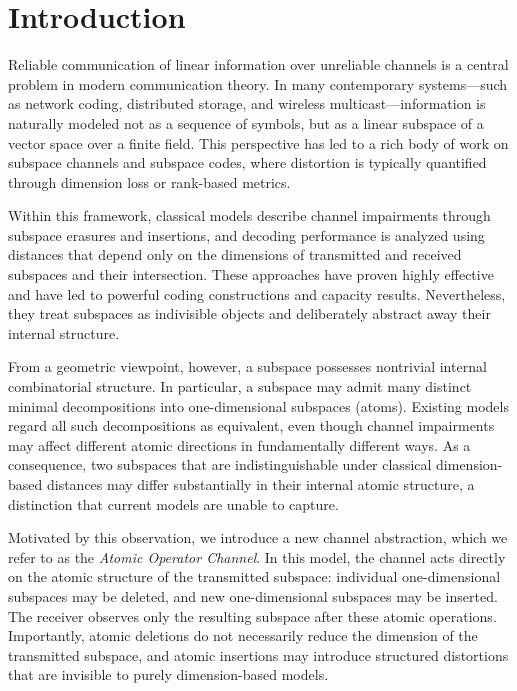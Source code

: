 \documentclass{svproc}
\begin{document}
\section{Introduction}
Reliable communication of linear information over unreliable channels is a central problem in modern communication theory. In many contemporary systems\allowbreak---such as network coding,
distributed storage, and wireless multicast\allowbreak---information is naturally modeled not as a sequence of symbols, but as a linear subspace of a vector space over a finite field. This perspective has led to a rich body of work on subspace channels and subspace codes, where distortion is typically quantified through dimension loss or rank-based metrics.

Within this framework, classical models describe channel impairments through subspace erasures and insertions, and decoding performance is analyzed using distances that depend only on the dimensions of transmitted and received subspaces and their intersection. These approaches have proven highly effective and have led to powerful coding constructions and capacity results. Nevertheless, they treat subspaces as indivisible objects and deliberately abstract away their internal structure.

From a geometric viewpoint, however, a subspace possesses nontrivial internal combinatorial structure. In particular, a subspace may admit many distinct minimal decompositions into one-dimensional subspaces (atoms). Existing models regard all such decompositions as equivalent, even though channel impairments may affect different atomic directions in fundamentally different ways. As a consequence, two subspaces that are indistinguishable under classical dimension-based distances may differ substantially in their internal atomic structure, a distinction that current models are unable to capture.

Motivated by this observation, we introduce a new channel abstraction, which we refer to as the \emph{Atomic Operator Channel}. In this model, the channel acts directly on the atomic structure of the transmitted subspace: individual one-dimensional subspaces may be deleted, and new one-dimensional subspaces may be inserted. The receiver observes only the resulting subspace after these atomic operations. Importantly, atomic deletions do not necessarily reduce the dimension of the transmitted subspace, and atomic insertions may introduce structured distortions that are invisible to purely dimension-based models.
\end{document}
